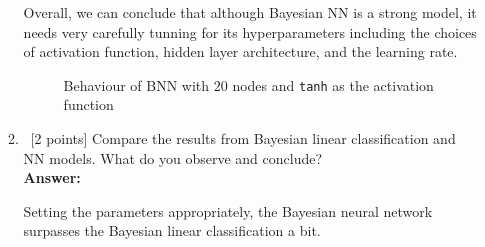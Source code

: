 \documentclass[12pt, fullpage,letterpaper]{article}
\def\red{\color{black!30!red}}
\def\blackblue{\color{black!40!blue}}
\begin{document}
\begin{enumerate}
\begin{enumerate}
{Overall, we can conclude that although Bayesian NN  is a strong model, it needs very carefully tunning for its hyperparameters including the choices of activation function, hidden layer architecture, and the learning rate. 
	\begin{figure}[H]
	\begin{center}
	 \end{center}
	 \caption{{\footnotesize Behaviour of BNN with $20$ nodes and \texttt{tanh} as the activation function}}\label{Fig1}    
	\end{figure}	

}
		
		\item~[2 points] Compare the results from Bayesian linear classification and NN models. What do you observe and conclude?\\
{\bf \red Answer: }{\blackblue 
Setting the parameters appropriately, the Bayesian neural network surpasses the Bayesian linear classification a bit. 

}
		
		
		
	\end{enumerate}



\end{enumerate}
\end{document}

